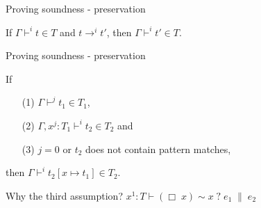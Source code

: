 \documentclass{beamer}
\newcommand{\quoted}[1]{\Box\;#1}
\newcommand{\patref}[1]{#1}
\newcommand{\patmat}[4]{\patmatSP{#1}{#2}\patmatThen{#3}#4}
\newcommand{\patmatSP}[2]{#1 \sim #2\;?}
\newcommand{\patmatThen}[1]{\;#1\; \| \;}
\begin{document}
\begin{frame}{Proving soundness - preservation}

\begin{theorem}[Preservation]
If $\Gamma \vdash^i t \in T$ and $t \longrightarrow^i t'$, then $\Gamma \vdash^i t' \in T$.
\end{theorem}
\end{frame}
\begin{frame}{Proving soundness - preservation}


\begin{lemma}[Substitution]
If 
\begin{itemize}
  \item[(1)] $\Gamma \vdash^j t_1 \in T_1$,
  \item[(2)] $\Gamma, x^j : T_1 \vdash^i t_2 \in T_2$ and
  \item[(3)] $j = 0$ or $t_2$ does not contain pattern matches,
\end{itemize}
then $\Gamma \vdash^i t_2[x \mapsto t_1] \in T_2$.
\end{lemma}

Why the third assumption? $x^1: T \vdash \patmat{(\quoted{x})}{\patref{x}}{e_1}{e_2}$


\end{frame}
\end{document}
